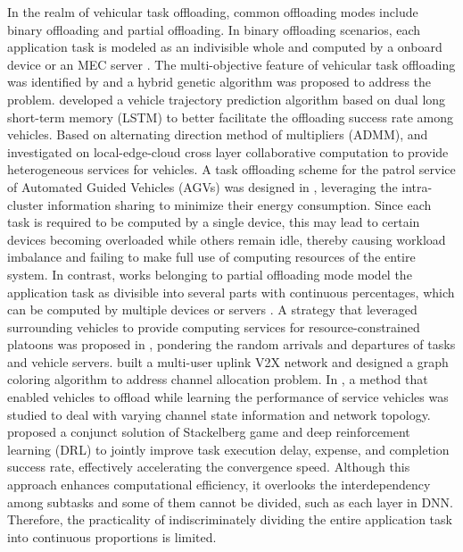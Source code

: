\documentclass[lettersize,journal]{IEEEtran}
\begin{document}

In the realm of vehicular task offloading, common offloading modes include binary offloading and partial offloading. In binary offloading scenarios, each application task is modeled as an indivisible whole and computed by a onboard device or an MEC server \cite{ref12,ref14,ref15,ref16,ref17,ref18}. The multi-objective feature of vehicular task offloading was identified by \cite{ref12} and a hybrid genetic algorithm was proposed to address the problem. \cite{ref15} developed a vehicle trajectory prediction algorithm based on dual long short-term memory (LSTM) to better facilitate the offloading success rate among vehicles. Based on alternating direction method of multipliers (ADMM), \cite{ref16} and \cite{ref17} investigated on local-edge-cloud cross layer collaborative computation to provide heterogeneous services for vehicles. A task offloading scheme for the patrol service of Automated Guided Vehicles (AGVs) was designed in \cite{ref18}, leveraging the intra-cluster information sharing to minimize their energy consumption. Since each task is required to be computed by a single device, this may lead to certain devices becoming overloaded while others remain idle, thereby causing workload imbalance and failing to make full use of computing resources of the entire system. In contrast, works belonging to partial offloading mode model the application task as divisible into several parts with continuous percentages, which can be computed by multiple devices or servers \cite{ref13,ref19,ref20,ref21}. A strategy that leveraged surrounding vehicles to provide computing services for resource-constrained platoons was proposed in \cite{ref13}, pondering the random arrivals and departures of tasks and vehicle servers. \cite{ref19} built a multi-user uplink V2X network and designed a graph coloring algorithm to address channel allocation problem. In \cite{ref20}, a method that enabled vehicles to offload while learning the performance of service vehicles was studied to deal with varying channel state information and network topology. \cite{ref21} proposed a conjunct solution of Stackelberg game and deep reinforcement learning (DRL) to jointly improve task execution delay, expense, and completion success rate, effectively accelerating the convergence speed. Although this approach enhances computational efficiency, it overlooks the interdependency among subtasks and some of them cannot be divided, such as each layer in DNN. Therefore, the practicality of indiscriminately dividing the entire application task into continuous proportions is limited.
\end{document}
